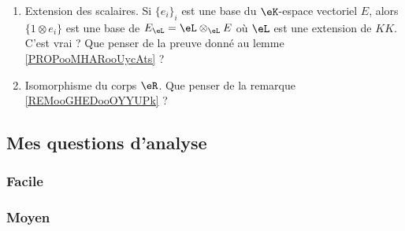 \begin{enumerate}
    \item
        Extension des scalaires. Si \( \{ e_i \}_i\) est une base du \( \eK\)-espace vectoriel \( E\), alors \( \{ 1\otimes e_i \}\) est une base de \( E_{\eL}=\eL\otimes_{\eL}E\) où \( \eL\) est une extension de \( KK\). C'est vrai ? Que penser de la preuve donné au lemme \ref{PROPooMHARooUycAts} ?
    \item
        Isomorphisme du corps \( \eR\). Que penser de la remarque \ref{REMooGHEDooOYYUPk} ?
\end{enumerate}

\subsection{Mes questions d'analyse}

\subsubsection{Facile}

\subsubsection{Moyen}


